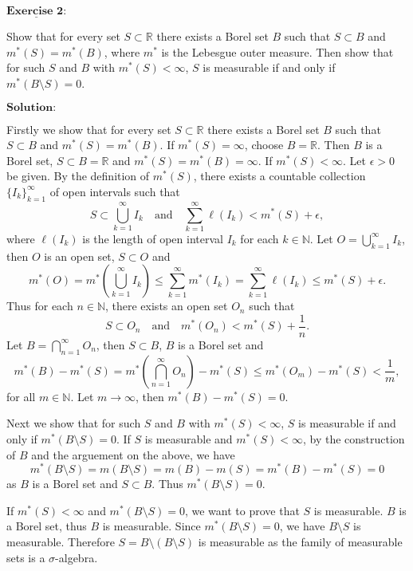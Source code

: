 \documentclass[12pt,a4paper]{ctexart}
\begin{document}
\newpage 

$\underline{\textbf{Exercise 2:}}$

Show that for every set $S \subset \mathbb R$ there exists a Borel set $B$ such that $S \subset B$ and $m^{*}(S) = m^{*}(B)$, where $m^*$ is the Lebesgue outer measure. Then show that for such $S$ and $B$ with $m^{*}(S) < \infty$, $S$ is measurable if and only if $m^{*} (B \setminus S) = 0$.

\vspace{8pt}
$\textbf{Solution:}$

Firstly we show that for every set $S \subset \mathbb R$ there exists a Borel set $B$ such that $S \subset B$ and $m^{*}(S) = m^{*}(B)$. If $m^{*}(S) = \infty$, choose $B = \mathbb R$. Then $B$ is a Borel set, $S \subset B = \mathbb R$ and $m^{*}(S) = m^{*}(B) = \infty$. If $m^{*}(S) < \infty$. Let $\epsilon > 0$ be given. By the definition of $m^{*}(S)$, there exists a countable collection $\{I_{k}\}_{k=1}^{\infty}$ of open intervals such that 
$$S \subset \bigcup_{k = 1}^{\infty} I_{k} \quad \text{and} \quad \sum_{k = 1}^{\infty} \ell(I_{k}) < m^{*}(S) + \epsilon,$$
where $\ell(I_k)$ is the length of open interval $I_k$ for each $k \in \mathbb N$.
Let $O = \bigcup_{k = 1}^{\infty} I_{k}$, then $O$ is an open set, $S \subset O$ and
$$m^{*}(O) = m^{*}\left(\bigcup_{k = 1}^{\infty} I_{k}\right) \leq \sum_{k=1}^{\infty} m^{*}(I_k) = \sum_{k = 1}^{\infty} \ell(I_{k}) \leq m^{*}(S) + \epsilon.$$
Thus for each $n \in \mathbb N$, there exists an open set $O_n$ such that
$$S \subset O_n \quad \text{and} \quad m^{*}(O_n) < m^*(S) + \frac{1}{n}.$$
Let $B = \bigcap_{n = 1}^{\infty} O_n$, then $S \subset B$, $B$ is a Borel set and
$$m^{*}(B) - m^{*}(S) = m^{*}\left(\bigcap_{n=1}^{\infty} O_n \right) - m^*(S) \leq m^{*}(O_m) -m^*(S)< \frac{1}{m},$$
for all $m \in \mathbb N$. Let $m \to \infty$, then $m^{*}(B) - m^{*}(S) = 0$.

Next we show that for such $S$ and $B$ with $m^{*}(S) < \infty$, $S$ is measurable if and only if $m^{*} (B \setminus S) = 0$. If $S$ is measurable and $m^{*}(S) < \infty$, by the construction of $B$ and the arguement on the above, we have
$$m^{*}(B \setminus S) = m(B \setminus S) = m(B) - m(S) = m^*(B) - m^*(S) = 0$$ 
as $B$ is a Borel set and $S \subset B$.
Thus $m^{*}(B \setminus S) = 0$.

If $m^{*}(S) < \infty$ and $m^{*} (B \setminus S) = 0$, we want to prove that $S$ is measurable. $B$ is a Borel set, thus $B$ is measurable. Since $m^{*} (B \setminus S) = 0$, we have $B \setminus S$ is measurable. Therefore $S = B \setminus (B \setminus S)$ is measurable as the family of measurable sets is a $\sigma$-algebra.
\end{document}
